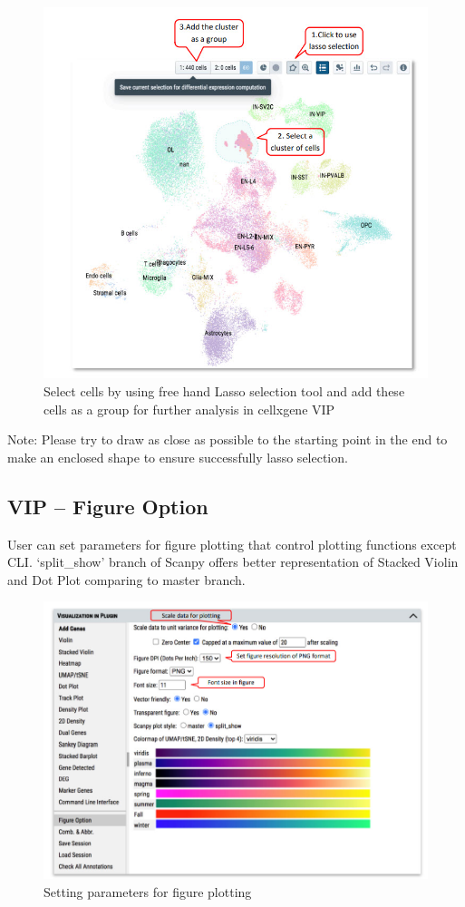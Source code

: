 \documentclass[
]{article}
\begin{document}
\begin{figure}
\centering
\includegraphics{figures/F4.jpg}
\caption{Select cells by using free hand Lasso selection tool and add these cells as a group for further analysis in cellxgene VIP}
\end{figure}

Note: Please try to draw as close as possible to the starting point in the end to make an enclosed shape to ensure successfully lasso selection.

\hypertarget{vip-figure-option}{%
\subsection{VIP -- Figure Option}\label{vip-figure-option}}

User can set parameters for figure plotting that control plotting functions except CLI. `split\_show' branch of Scanpy offers better representation of Stacked Violin and Dot Plot comparing to master branch.

\begin{figure}
\centering
\includegraphics{figures/F5.jpg}
\caption{Setting parameters for figure plotting}
\end{figure}
\end{document}
